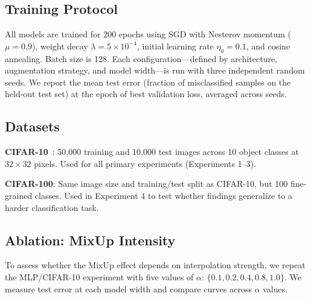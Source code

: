 \subsection{Training Protocol}

All models are trained for 200 epochs using SGD with Nesterov momentum ($\mu{=}0.9$), weight decay $\lambda{=}5{\times}10^{-4}$, initial learning rate $\eta_0{=}0.1$, and cosine annealing. Batch size is 128. Each configuration---defined by architecture, augmentation strategy, and model width---is run with three independent random seeds. We report the mean test error (fraction of misclassified samples on the held-out test set) at the epoch of best validation loss, averaged across seeds.

\subsection{Datasets}

\textbf{CIFAR-10}~\cite{krizhevsky2009learning}: 50,000 training and 10,000 test images across 10 object classes at $32{\times}32$ pixels. Used for all primary experiments (Experiments 1--3).

\textbf{CIFAR-100}: Same image size and training/test split as CIFAR-10, but 100 fine-grained classes. Used in Experiment 4 to test whether findings generalize to a harder classification task.

\subsection{Ablation: MixUp Intensity}

To assess whether the MixUp effect depends on interpolation strength, we repeat the MLP/CIFAR-10 experiment with five values of $\alpha$: $\{0.1, 0.2, 0.4, 0.8, 1.0\}$. We measure test error at each model width and compare curves across $\alpha$ values.
